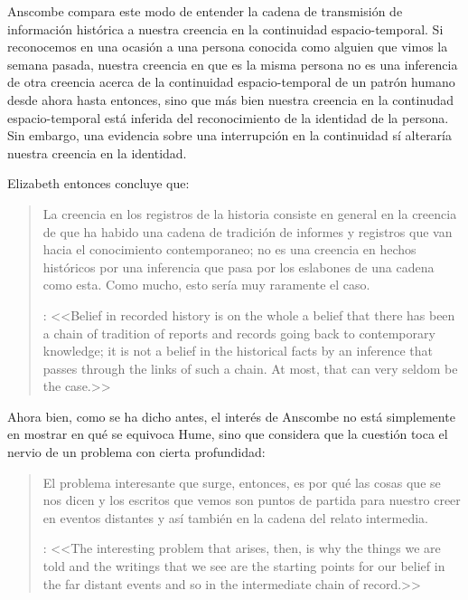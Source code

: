 Anscombe compara este modo de entender la cadena de transmisión de información histórica a nuestra creencia en la continuidad espacio-temporal. Si reconocemos en una ocasión a una persona conocida como alguien que vimos la semana pasada, nuestra creencia en que es la misma persona no es una inferencia de otra creencia acerca de la continuidad espacio-temporal de un patrón humano desde ahora hasta entonces, sino que más bien nuestra creencia en la continudad espacio-temporal está inferida del reconocimiento de la identidad de la persona. Sin embargo, una evidencia sobre una interrupción en la continuidad sí alteraría nuestra creencia en la identidad.

Elizabeth entonces concluye que: \blockquote[{\cite[89]{anscombe1981parmenides:humeandjulius}}: <<Belief in recorded history is on the whole a belief that there has been a chain of tradition of reports and records going back to contemporary knowledge; it is not a belief in the historical facts by an inference that passes through the links of such a chain. At most, that can very seldom be the case.>>]{La creencia en los registros de la historia consiste en general en la creencia de que ha habido una cadena de tradición de informes y registros que van hacia el conocimiento contemporaneo; no es una creencia en hechos históricos por una inferencia que pasa por los eslabones de una cadena como esta. Como mucho, esto sería muy raramente el caso.}

Ahora bien, como se ha dicho antes, el interés de Anscombe no está simplemente en mostrar en qué se equivoca Hume, sino que considera que la cuestión toca el nervio de un problema con cierta profundidad: \blockquote[{\cite[122]{anscombe2011plato:humecaus}}: <<The interesting problem that arises, then, is why the things we are told and the writings that we see are the starting points for our belief in the far distant events and so in the intermediate chain of record.>>]{El problema interesante que surge, entonces, es por qué las cosas que se nos dicen y los escritos que vemos son puntos de partida para nuestro creer en eventos distantes y así también en la cadena del relato intermedia.}

